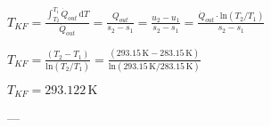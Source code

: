 \( T_{KF} = \frac{\int_{T_2}^{T_1} \dot{Q}_{out} \, \text{d}T}{\dot{Q}_{out}} = \frac{Q_{out}}{s_2 - s_1} = \frac{u_2 - u_1}{s_2 - s_1} = \frac{\dot{Q}_{out} \cdot \text{ln}(T_2 / T_1)}{s_2 - s_1} \)  

\( T_{KF} = \frac{(T_2 - T_1)}{\text{ln}(T_2 / T_1)} = \frac{(293.15 \, \text{K} - 283.15 \, \text{K})}{\text{ln}(293.15 \, \text{K} / 283.15 \, \text{K})} \)  

\( T_{KF} = 293.122 \, \text{K} \)  

---